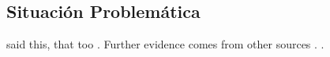 \subsection{Situación Problemática}

\Textcite{Borst2011c} said this, that
too \parencite{deWaal2009,Haybron2008}.  Further evidence comes from
other sources \parencite{Shotton1989,Lassen2006}. .
